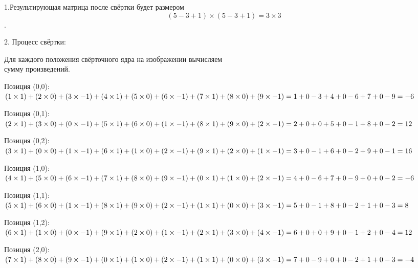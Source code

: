 \begin{description}
1.Результирующая матрица после свёртки будет размером
$$ (5-3+1) \times (5-3+1) = 3 \times 3 $$.

2. Процесс свёртки:

Для каждого положения свёрточного ядра на изображении вычисляем\\
сумму произведений.

Позиция (0,0):
$
(1 \times 1) + (2 \times 0) + (3 \times -1) + \\
(4 \times 1) + (5 \times 0) + (6 \times -1) + \\
(7 \times 1) + (8 \times 0) + (9 \times -1) = \\
1 + 0 - 3 + 4 + 0 - 6 + 7 + 0 - 9 = -6
$

 Позиция (0,1):
$
(2 \times 1) + (3 \times 0) + (0 \times -1) + \\
(5 \times 1) + (6 \times 0) + (1 \times -1) + \\
(8 \times 1) + (9 \times 0) + (2 \times -1) = \\
2 + 0 + 0 + 5 + 0 - 1 + 8 + 0 - 2 = 12
$

Позиция (0,2):
$
(3 \times 1) + (0 \times 0) + (1 \times -1) + \\
(6 \times 1) + (1 \times 0) + (2 \times -1) + \\
(9 \times 1) + (2 \times 0) + (1 \times -1) = \\
3 + 0 - 1 + 6 + 0 - 2 + 9 + 0 - 1 = 16
$

Позиция (1,0):
$
(4 \times 1) + (5 \times 0) + (6 \times -1) + \\
(7 \times 1) + (8 \times 0) + (9 \times -1) + \\
(0 \times 1) + (1 \times 0) + (2 \times -1) = \\
4 + 0 - 6 + 7 + 0 - 9 + 0 + 0 - 2 = -6
$

Позиция (1,1):
$
(5 \times 1) + (6 \times 0) + (1 \times -1) + \\
(8 \times 1) + (9 \times 0) + (2 \times -1) + \\
(1 \times 1) + (0 \times 0) + (3 \times -1) = \\
5 + 0 - 1 + 8 + 0 - 2 + 1 + 0 - 3 = 8
$

Позиция (1,2):
$
(6 \times 1) + (1 \times 0) + (0 \times -1) + \\
(9 \times 1) + (2 \times 0) + (1 \times -1) + \\
(2 \times 1) + (3 \times 0) + (4 \times -1) = \\
6 + 0 + 0 + 9 + 0 - 1 + 2 + 0 - 4 = 12
$

Позиция (2,0):
$
(7 \times 1) + (8 \times 0) + (9 \times -1) + \\
(0 \times 1) + (1 \times 0) + (2 \times -1) + \\
(1 \times 1) + (0 \times 0) + (3 \times -1) = \\
7 + 0 - 9 + 0 + 0 - 2 + 1 + 0 - 3 = -4
$


\end{description}

